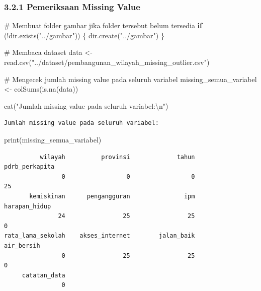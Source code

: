 \documentclass[
  indonesian,
  letterpaper,
  DIV=11,
  numbers=noendperiod]{scrartcl}
\newenvironment{Shaded}{\begin{snugshade}}{\end{snugshade}}
\newcommand{\CommentTok}[1]{\textcolor[rgb]{0.37,0.37,0.37}{#1}}
\newcommand{\ControlFlowTok}[1]{\textcolor[rgb]{0.00,0.23,0.31}{\textbf{#1}}}
\newcommand{\FunctionTok}[1]{\textcolor[rgb]{0.28,0.35,0.67}{#1}}
\newcommand{\NormalTok}[1]{\textcolor[rgb]{0.00,0.23,0.31}{#1}}
\newcommand{\OtherTok}[1]{\textcolor[rgb]{0.00,0.23,0.31}{#1}}
\newcommand{\SpecialCharTok}[1]{\textcolor[rgb]{0.37,0.37,0.37}{#1}}
\newcommand{\StringTok}[1]{\textcolor[rgb]{0.13,0.47,0.30}{#1}}
\begin{document}
\subsubsection{3.2.1 Pemeriksaan Missing
Value}\label{pemeriksaan-missing-value}

\begin{Shaded}
\begin{Highlighting}[]
\CommentTok{\# Membuat folder gambar jika folder tersebut belum tersedia}
\ControlFlowTok{if}\NormalTok{ (}\SpecialCharTok{!}\FunctionTok{dir.exists}\NormalTok{(}\StringTok{"../gambar"}\NormalTok{)) \{}
  \FunctionTok{dir.create}\NormalTok{(}\StringTok{"../gambar"}\NormalTok{)}
\NormalTok{\}}

\CommentTok{\# Membaca dataset}
\NormalTok{data }\OtherTok{\textless{}{-}} \FunctionTok{read.csv}\NormalTok{(}\StringTok{"../dataset/pembangunan\_wilayah\_missing\_outlier.csv"}\NormalTok{)}

\CommentTok{\# Mengecek jumlah missing value pada seluruh variabel}
\NormalTok{missing\_semua\_variabel }\OtherTok{\textless{}{-}} \FunctionTok{colSums}\NormalTok{(}\FunctionTok{is.na}\NormalTok{(data))}

\FunctionTok{cat}\NormalTok{(}\StringTok{"Jumlah missing value pada seluruh variabel:}\SpecialCharTok{\textbackslash{}n}\StringTok{"}\NormalTok{)}
\end{Highlighting}
\end{Shaded}

\begin{verbatim}
Jumlah missing value pada seluruh variabel:
\end{verbatim}

\begin{Shaded}
\begin{Highlighting}[]
\FunctionTok{print}\NormalTok{(missing\_semua\_variabel)}
\end{Highlighting}
\end{Shaded}

\begin{verbatim}
          wilayah          provinsi             tahun    pdrb_perkapita 
                0                 0                 0                25 
       kemiskinan      pengangguran               ipm     harapan_hidup 
               24                25                25                 0 
rata_lama_sekolah    akses_internet        jalan_baik        air_bersih 
                0                25                25                 0 
     catatan_data 
                0 
\end{verbatim}
\end{document}
